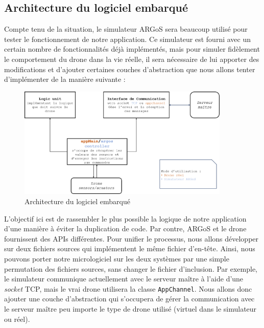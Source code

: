 \documentclass{mistcoursedoc}
\begin{document}
\subsection{Architecture du logiciel embarqué}

Compte tenu de la situation, le simulateur ARGoS sera beaucoup utilisé pour tester le fonctionnement de notre application. Ce simulateur est fourni avec un certain nombre de fonctionnalités déjà implémentés, mais pour simuler fidèlement le comportement du drone dans la vie réelle, il sera nécessaire de lui apporter des modifications et d'ajouter certaines couches d'abstraction que nous allons tenter d'implémenter de la manière suivante :

\begin{figure}[h!]
    \centering
    \includegraphics[width=0.9\textwidth]{firmware-architecture.png}
    \caption{Architecture du logiciel embarqué}
\end{figure}

L'objectif ici est de rassembler le plus possible la logique de notre application d'une manière à éviter la duplication de code. Par contre, ARGoS et le drone fournissent des APIs différentes. Pour unifier le processus, nous allons développer sur deux fichiers sources qui implémentent le même fichier d’en-tête. Ainsi, nous pouvons porter notre micrologiciel sur les deux systèmes par une simple permutation des fichiers sources, sans changer le fichier d’inclusion. Par exemple, le simulateur communique actuellement avec le serveur maître à l'aide d'une \emph{socket} TCP, mais le vrai drone utilisera la classe \texttt{AppChannel}. Nous allons donc ajouter une couche d'abstraction qui s'occupera de gérer la communication avec le serveur maître peu importe le type de drone utilisé (virtuel dans le simulateur ou réel).
\end{document}
